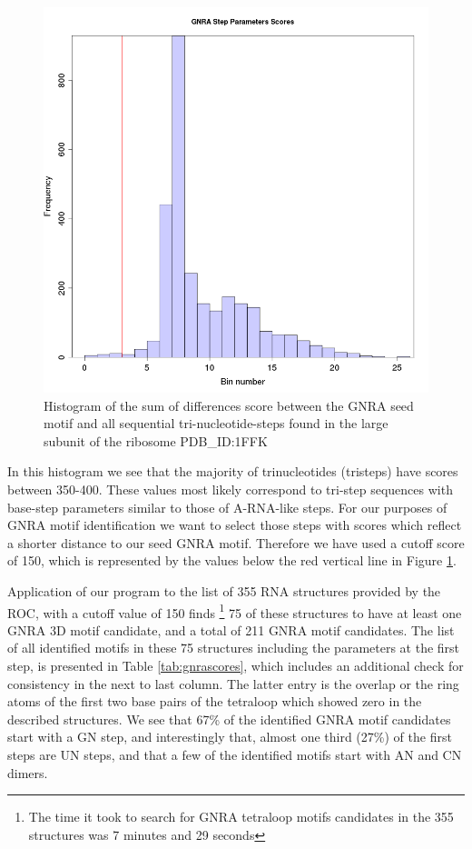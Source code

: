 \begin{figure}
\centering 
\includegraphics[angle=0, scale=0.5]{Chapter5/gnrahisto.png}
\caption{Histogram of  the sum of  differences score between  the GNRA
  seed  motif and  all  sequential tri-nucleotide-steps  found in  the
  large subunit of the ribosome PDB\_ID:1FFK}
\label{fig:gnrahist}
\end{figure}

In  this  histogram  we   see  that  the  majority  of  trinucleotides
(tristeps)  have scores  between  350-400.  These  values most  likely
correspond to tri-step sequences  with base-step parameters similar to
those  of   A-RNA-like  steps.   For   our  purposes  of   GNRA  motif
identification we want to select those steps with scores which reflect
a shorter distance  to our seed GNRA motif.  Therefore  we have used a
cutoff score of 150, which is  represented by the values below the red
vertical line in Figure \ref{fig:gnrahist}.

Application of our program to  the list of 355 RNA structures provided
by the  ROC, with a  cutoff value of  150 finds \footnote{The  time it
  took  to search  for GNRA  tetraloop  motifs candidates  in the  355
  structures was 7  minutes and 29 seconds} 75  of these structures to
have at  least one GNRA  3D motif candidate,  and a total of  211 GNRA
motif  candidates.  The  list of  all  identified motifs  in these  75
structures including the parameters at the first step, is presented in
Table  \ref{tab:gnrascores}, which  includes an  additional  check for
consistency  in the  next  to last  column.  The latter  entry is  the
overlap or the ring atoms of the first two base pairs of the tetraloop
which showed  zero in the described  structures.  We see  that 67\% of
the  identified  GNRA motif  candidates  start  with  a GN  step,  and
interestingly that, almost one third  (27\%) of the first steps are UN
steps, and  that a few of the  identified motifs start with  AN and CN
dimers.

